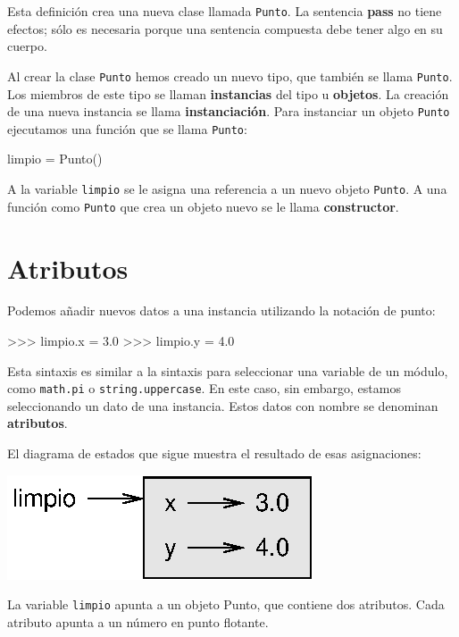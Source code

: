 Esta definición crea una nueva clase llamada \texttt{Punto}. La sentencia
\textbf{pass} no tiene efectos; sólo es necesaria porque una sentencia
compuesta debe tener algo en su cuerpo.

Al crear la clase \texttt{Punto} hemos creado un nuevo tipo, que también
se llama \texttt{Punto}. Los miembros de este tipo se llaman \textbf{instancias}
del tipo u \textbf{objetos}. La creación de una nueva instancia se
llama \textbf{instanciación}. Para instanciar un objeto \texttt{Punto}
ejecutamos una función que se llama \texttt{Punto}:

  
\begin{pythoncode}
limpio = Punto()
\end{pythoncode}

A la variable \texttt{limpio} se le asigna una referencia a un nuevo
objeto \texttt{Punto}. A una función como \texttt{Punto} que crea
un objeto nuevo se le llama \textbf{constructor}.

\section{Atributos}


Podemos añadir nuevos datos a una instancia utilizando la notación
de punto:
\begin{pyconcode}
>>> limpio.x = 3.0
>>> limpio.y = 4.0
\end{pyconcode}

Esta sintaxis es similar a la sintaxis para seleccionar una variable
de un módulo, como \texttt{math.pi} o \texttt{string.uppercase}. En
este caso, sin embargo, estamos seleccionando un dato de una instancia.
Estos datos con nombre se denominan \textbf{atributos}.

El diagrama de estados que sigue muestra el resultado de esas asignaciones:

\beforefig \centerline{\includegraphics{illustrations/point}}
\afterfig

La variable \texttt{limpio} apunta a un objeto Punto, que contiene
dos atributos. Cada atributo apunta a un número en punto flotante.


